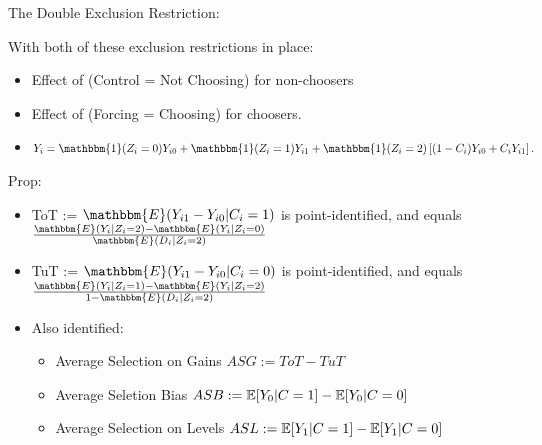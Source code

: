 \documentclass[8pt]{beamer}
\begin{document}
\begin{frame}{The Double Exclusion Restriction:}


With both of these exclusion restrictions in place:
\begin{itemize}
    \item Effect of (Control = Not Choosing) for non-choosers
    \item Effect of (Forcing = Choosing) for choosers.
    \end{itemize}
\begin{itemize}
    \item  $Y_i = \mathbbm{1}(Z_i =0) Y_{i0} + \mathbbm{1}(Z_i = 1)  Y_{i1}  + \mathbbm{1}(Z_i = 2) \left[(1 - C_i) Y_{i0} + C_i Y_{i1} \right].$
\end{itemize}

\vspace{.2in}

Prop:
\begin{itemize}
    \item ToT := $\mathbbm{E}(Y_{i1} - Y_{i0} | C_i = 1)$ is point-identified, and equals $\frac{\mathbbm{E}(Y_i|Z_i=2) - \mathbbm{E}(Y_i|Z_i =0)}{\mathbbm{E}(D_i|Z_i=2)} $
     \item TuT := $\mathbbm{E}(Y_{i1} - Y_{i0} | C_i = 0)$ is point-identified, and equals $\frac{\mathbbm{E}(Y_i|Z_i=1) - \mathbbm{E}(Y_i|Z_i =2)}{1-\mathbbm{E}(D_i|Z_i=2)} $
     \item Also identified: 
     \begin{itemize}
         \item Average Selection on Gains $ASG:=ToT-TuT$
         \item Average Seletion Bias $ASB:= \mathbb{E}[Y_0 | C=1]-\mathbb{E}[Y_0 | C=0]$
         \item Average Selection on Levels $ASL:= \mathbb{E}[Y_1 | C=1]-\mathbb{E}[Y_1 | C=0]$
     \end{itemize}
\end{itemize}
\end{frame}
\end{document}

